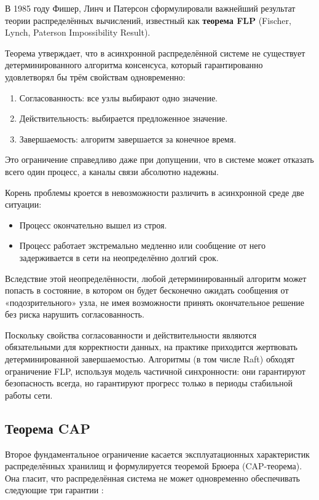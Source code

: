 В 1985 году Фишер, Линч и Патерсон сформулировали важнейший результат теории распределённых вычислений, известный как \textbf{теорема FLP} (Fischer, Lynch, Paterson Impossibility Result).

Теорема утверждает, что в асинхронной распределённой системе не существует детерминированного алгоритма консенсуса, который гарантированно удовлетворял бы трём свойствам одновременно:
\begin{enumerate}
    \item Согласованность: все узлы выбирают одно значение.
    \item Действительность: выбирается предложенное значение.
    \item Завершаемость: алгоритм завершается за конечное время.
\end{enumerate}
Это ограничение справедливо даже при допущении, что в системе может отказать всего один процесс, а каналы связи абсолютно надежны.

Корень проблемы кроется в невозможности различить в асинхронной среде две ситуации:
\begin{itemize}
    \item Процесс окончательно вышел из строя.
    \item Процесс работает экстремально медленно или сообщение от него задерживается в сети на неопределённо долгий срок.
\end{itemize}
Вследствие этой неопределённости, любой детерминированный алгоритм может попасть в состояние, в котором он будет бесконечно ожидать сообщения от «подозрительного» узла, не имея возможности принять окончательное решение без риска нарушить согласованность.

Поскольку свойства согласованности и действительности являются обязательными для корректности данных, на практике приходится жертвовать детерминированной завершаемостью. Алгоритмы (в том числе Raft) обходят ограничение FLP, используя модель частичной синхронности: они гарантируют безопасность всегда, но гарантируют прогресс только в периоды стабильной работы сети.

\subsection{Теорема CAP}

Второе фундаментальное ограничение касается эксплуатационных характеристик распределённых хранилищ и формулируется теоремой Брюера (CAP-теорема). Она гласит, что распределённая система не может одновременно обеспечивать следующие три гарантии \cite{cap_theorem,kleppmann}:


